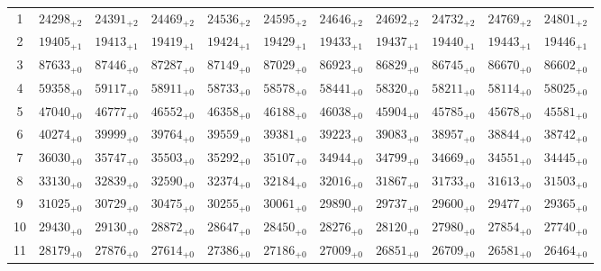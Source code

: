 \documentclass[10pt, a4paper]{article}
\begin{document}
\begin{center}
\begin{tabular}{c || c c c c c | c c c c c}
        1 & \({24298}_{+2}\) & \({24391}_{+2}\) & \({24469}_{+2}\) & \({24536}_{+2}\) & \({24595}_{+2}\) & \({24646}_{+2}\) & \({24692}_{+2}\) & \({24732}_{+2}\) & \({24769}_{+2}\) & \({24801}_{+2}\)\\
        2 & \({19405}_{+1}\) & \({19413}_{+1}\) & \({19419}_{+1}\) & \({19424}_{+1}\) & \({19429}_{+1}\) & \({19433}_{+1}\) & \({19437}_{+1}\) & \({19440}_{+1}\) & \({19443}_{+1}\) & \({19446}_{+1}\)\\
        3 & \({87633}_{+0}\) & \({87446}_{+0}\) & \({87287}_{+0}\) & \({87149}_{+0}\) & \({87029}_{+0}\) & \({86923}_{+0}\) & \({86829}_{+0}\) & \({86745}_{+0}\) & \({86670}_{+0}\) & \({86602}_{+0}\)\\
        4 & \({59358}_{+0}\) & \({59117}_{+0}\) & \({58911}_{+0}\) & \({58733}_{+0}\) & \({58578}_{+0}\) & \({58441}_{+0}\) & \({58320}_{+0}\) & \({58211}_{+0}\) & \({58114}_{+0}\) & \({58025}_{+0}\)\\
        5 & \({47040}_{+0}\) & \({46777}_{+0}\) & \({46552}_{+0}\) & \({46358}_{+0}\) & \({46188}_{+0}\) & \({46038}_{+0}\) & \({45904}_{+0}\) & \({45785}_{+0}\) & \({45678}_{+0}\) & \({45581}_{+0}\)\\
        \hline
        6 & \({40274}_{+0}\) & \({39999}_{+0}\) & \({39764}_{+0}\) & \({39559}_{+0}\) & \({39381}_{+0}\) & \({39223}_{+0}\) & \({39083}_{+0}\) & \({38957}_{+0}\) & \({38844}_{+0}\) & \({38742}_{+0}\)\\
        7 & \({36030}_{+0}\) & \({35747}_{+0}\) & \({35503}_{+0}\) & \({35292}_{+0}\) & \({35107}_{+0}\) & \({34944}_{+0}\) & \({34799}_{+0}\) & \({34669}_{+0}\) & \({34551}_{+0}\) & \({34445}_{+0}\)\\
        8 & \({33130}_{+0}\) & \({32839}_{+0}\) & \({32590}_{+0}\) & \({32374}_{+0}\) & \({32184}_{+0}\) & \({32016}_{+0}\) & \({31867}_{+0}\) & \({31733}_{+0}\) & \({31613}_{+0}\) & \({31503}_{+0}\)\\
        9 & \({31025}_{+0}\) & \({30729}_{+0}\) & \({30475}_{+0}\) & \({30255}_{+0}\) & \({30061}_{+0}\) & \({29890}_{+0}\) & \({29737}_{+0}\) & \({29600}_{+0}\) & \({29477}_{+0}\) & \({29365}_{+0}\)\\
        10 & \({29430}_{+0}\) & \({29130}_{+0}\) & \({28872}_{+0}\) & \({28647}_{+0}\) & \({28450}_{+0}\) & \({28276}_{+0}\) & \({28120}_{+0}\) & \({27980}_{+0}\) & \({27854}_{+0}\) & \({27740}_{+0}\)\\
        \hline
        11 & \({28179}_{+0}\) & \({27876}_{+0}\) & \({27614}_{+0}\) & \({27386}_{+0}\) & \({27186}_{+0}\) & \({27009}_{+0}\) & \({26851}_{+0}\) & \({26709}_{+0}\) & \({26581}_{+0}\) & \({26464}_{+0}\)\\

\end{tabular}
\end{center}
\end{document}
